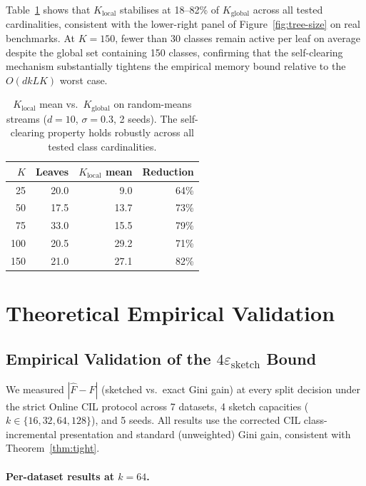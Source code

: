 \documentclass{article}
\begin{document}
Table~\ref{tab:klocal} shows that $K_{\mathrm{local}}$ stabilises at
18--82\% of $K_{\mathrm{global}}$ across all tested cardinalities, consistent
with the lower-right panel of Figure~\ref{fig:tree-size} on real benchmarks.
At $K{=}150$, fewer than 30 classes remain active per leaf on average despite
the global set containing 150 classes, confirming that the self-clearing
mechanism substantially tightens the empirical memory bound relative to the
$O(dkLK)$ worst case.

\begin{table}[h]
\centering
\caption{$K_{\mathrm{local}}$ mean vs.\ $K_{\mathrm{global}}$ on
random-means streams ($d{=}10$, $\sigma{=}0.3$, 2 seeds). The
self-clearing property holds robustly across all tested class cardinalities.}
\label{tab:klocal}
\begin{tabular}{rrrr}
\toprule
$K$ & Leaves & $K_{\mathrm{local}}$ mean & Reduction \\
\midrule
25  & 20.0 &  9.0 & 64\% \\
50  & 17.5 & 13.7 & 73\% \\
75  & 33.0 & 15.5 & 79\% \\
100 & 20.5 & 29.2 & 71\% \\
150 & 21.0 & 27.1 & 82\% \\
\bottomrule
\end{tabular}
\end{table}


\section{Theoretical Empirical Validation}
\label{app:theory-validation}

\subsection{Empirical Validation of the $4\varepsilon_{\mathrm{sketch}}$ Bound}
\label{app:sketch-bound}

We measured $|\hat{F} - F|$ (sketched vs.\ exact Gini gain) at every split
decision under the strict Online CIL protocol across 7 datasets, 4 sketch
capacities ($k \in \{16, 32, 64, 128\}$), and 5 seeds. All results use the
corrected CIL class-incremental presentation and standard (unweighted) Gini
gain, consistent with Theorem~\ref{thm:tight}.


\paragraph{Per-dataset results at $k{=}64$.}
\end{document}
